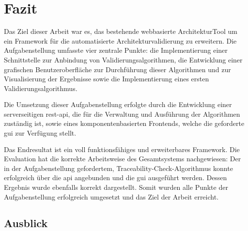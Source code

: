
\chapter{Fazit}
\label{ch:fazit}



Das Ziel dieser Arbeit war es, das bestehende webbasierte ArchitekturTool um ein Framework für die automatisierte Architekturvalidierung zu erweitern. Die Aufgabenstellung umfasste vier zentrale Punkte: die Implementierung einer Schnittstelle zur Anbindung von Validierungsalgorithmen, die Entwicklung einer grafischen Benutzeroberfläche zur Durchführung dieser Algorithmen und zur Visualisierung der Ergebnisse sowie die Implementierung eines ersten Validierungsalgorithmus.

Die Umsetzung dieser Aufgabenstellung erfolgte durch die Entwicklung einer serverseitigen \gls{rest}-\gls{api}, die für die Verwaltung und  Ausführung der Algorithmen zuständig ist, sowie eines komponentenbasierten Frontends, welche die geforderte \gls{gui} zur Verfügung stellt.

Das Endresultat ist ein voll funktionsfähiges und erweiterbares Framework. Die Evaluation hat die korrekte Arbeitsweise des Gesamtsystems nachgewiesen: Der in der Aufgabenstellung gefordertem, Traceability-Check-Algorithmus konnte erfolgreich über die \gls{api} angebunden und die \gls{gui} ausgeführt werden. Dessen Ergebnis wurde ebenfalls korrekt dargestellt. Somit wurden alle Punkte der Aufgabenstellung erfolgreich umgesetzt und das Ziel der Arbeit erreicht.

\section{Ausblick} %


